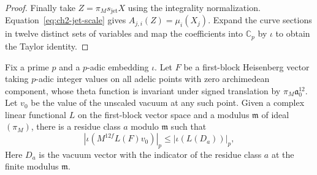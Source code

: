 \begin{proof}
Finally take $Z=\pi_M s_{\mathrm{jet}}X$ using the integrality normalization. Equation~\eqref{eq:ch2-jet-scale} gives $A_{j,i}(Z)=\mu_i(X_j)$. Expand the curve sections in twelve distinct sets of variables and map the coefficients into $\mathbb C_p$ by $\iota$ to obtain the Taylor identity.
\end{proof}

\begin{lemma}
\label{lem:c-derivative-fourier-indicator}
\emitthmsource
Fix a prime $p$ and a $p$-adic embedding $\iota$. Let $F$ be a first-block Heisenberg vector taking $p$-adic integer values on all adelic points with zero archimedean component, whose theta function is invariant under signed translation by $\pi_M\mathfrak a_0^{12}$. Let $v_0$ be the value of the unscaled vacuum at any such point. Given a complex linear functional $L$ on the first-block vector space and a modulus $\mathfrak m$ of ideal $(\pi_M)$, there is a residue class $a$ modulo $\mathfrak m$ such that
\[
  |\iota(M^{12f}L(F)v_0)|_p\le|\iota(L(D_a))|_p ,
\]
Here $D_a$ is the vacuum vector with the indicator of the residue class $a$ at the finite modulus $\mathfrak m$.
\end{lemma}

